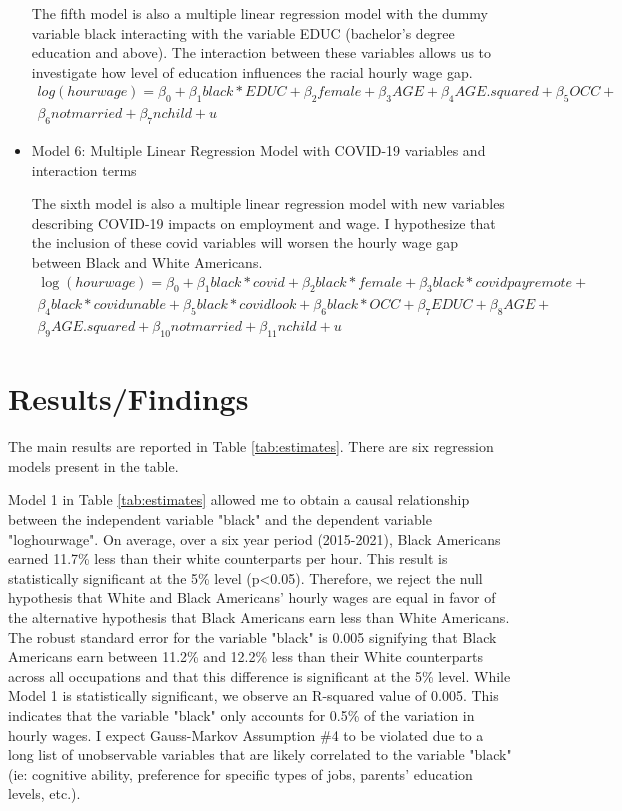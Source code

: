 \documentclass[12pt, english]{article}
\begin{document}
\begin{itemize}
        The fifth model is also a multiple linear regression model with the dummy variable black interacting with the variable EDUC (bachelor’s degree education and above). The interaction between these variables allows us to investigate how level of education influences the racial hourly wage gap.
        \begin{multline*}
            log(hourwage) = \beta_0 + \beta_1black*EDUC + \beta_2female + \beta_3AGE + \beta_4AGE.squared + \beta_5OCC +\\ \beta_6notmarried + \beta_7nchild + u
        \end{multline*}
        \item Model 6: Multiple Linear Regression Model with COVID-19 variables and interaction terms

        The sixth model is also a multiple linear regression model with new variables describing COVID-19 impacts on employment and wage. I hypothesize that the inclusion of these covid variables will worsen the hourly wage gap between Black and White Americans.
        \begin{multline*}
            \log(hourwage) = \beta_0 + \beta_1black*covid + \beta_2black*female + \beta_3black*covidpayremote +\\ \beta_4black*covidunable + \beta_5black*covidlook + \beta_6black*OCC + \beta_7EDUC + \beta_8AGE +\\ \beta_9AGE.squared + \beta_10notmarried + \beta_11nchild + u
        \end{multline*}


    \end{itemize}
\section{Results/Findings}
The main results are reported in Table \ref{tab:estimates}. There are six regression models present in the table. 

Model 1 in Table \ref{tab:estimates} allowed me to obtain a causal relationship between the independent variable "black" and the dependent variable "loghourwage". On average, over a six year period (2015-2021), Black Americans earned 11.7\% less than their white counterparts per hour. This result is statistically significant at the 5\% level (p\textless0.05). Therefore, we reject the null hypothesis that White and Black Americans' hourly wages are equal in favor of the alternative hypothesis that Black Americans earn less than White Americans. The robust standard error for the variable "black" is 0.005 signifying that Black Americans earn between 11.2\% and 12.2\% less than their White counterparts across all occupations and that this difference is significant at the 5\% level. While Model 1 is statistically significant, we observe an R-squared value of 0.005. This indicates that the variable "black" only accounts for 0.5\% of the variation in hourly wages. I expect Gauss-Markov Assumption \#4 to be violated due to a long list of unobservable variables that are likely correlated to the variable "black" (ie: cognitive ability, preference for specific types of jobs, parents' education levels, etc.).
\end{document}
